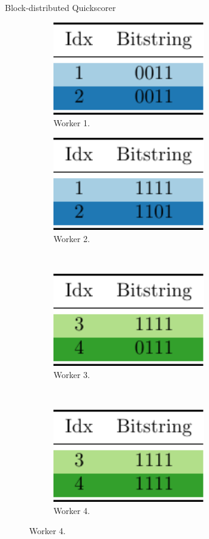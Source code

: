 \documentclass[final]{beamer}
\newlength{\onecolwid}
\begin{document}
\begin{frame}[t]
\begin{columns}[t]
\begin{column}{\onecolwid}
\begin{block}{Block-distributed Quickscorer}
		\begin{figure}
			\centering
			\begin{subfigure}[t]{0.45\onecolwid}
				\centering
				\includegraphics[height=4cm]{w1-quickscorer}
				\caption{Worker 1.}
			\end{subfigure}
			\quad
			\begin{subfigure}[t]{0.45\onecolwid}
				\centering
				\includegraphics[height=4cm]{w2-quickscorer}
				\caption{Worker 2.}
			\end{subfigure}
			\\
			\vspace{15pt}
			\begin{subfigure}[t]{0.45\onecolwid}
				\centering
				\includegraphics[height=4cm]{w3-quickscorer}
				\caption{Worker 3.}
			\end{subfigure}
			~
			\begin{subfigure}[t]{0.45\onecolwid}
				\centering
				\includegraphics[height=4cm]{w4-quickscorer}
				\caption{Worker 4.}
			\end{subfigure}
			

\end{figure}
\end{block}
\end{column}
\end{columns}
\end{frame}
\end{document}
